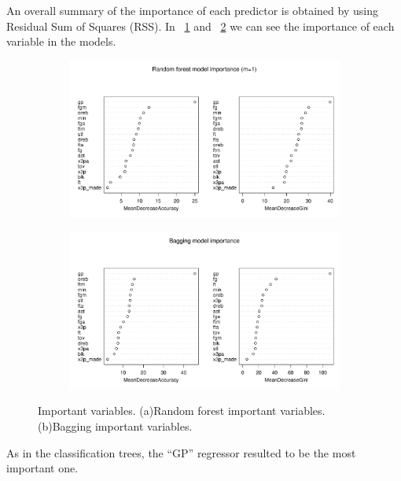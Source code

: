 An overall summary of the importance of each predictor is obtained by using Residual Sum of Squares (RSS). In \Fig~\ref{fig:best_for_500_var_imp_plot} and \Fig~\ref{fig:bagg_500_var_imp_plot} we can see the importance of each variable in the models.

\begin{figure}[H]
	\centering
	\begin{subfigure}{.5\textwidth}
		\centering
		\includegraphics[width=0.9\linewidth]{ImageFiles/Classification/Trees/best_for_500_var_imp_plot.pdf}
		\caption{}
		\label{fig:best_for_500_var_imp_plot}
	\end{subfigure}%
	\hfill
	\begin{subfigure}{.5\textwidth}
		\centering
		\includegraphics[width=0.9\linewidth]{ImageFiles/Classification/Trees/bagg_500_var_imp_plot.pdf}
		\caption{}
		\label{fig:bagg_500_var_imp_plot}
	\end{subfigure}
	\caption{Important variables. (a)Random forest important variables. (b)Bagging important variables.}
	\label{fig:ImpVar}
\end{figure}

\noindent
As in the classification trees, the ``GP'' regressor resulted to be the most important one.

